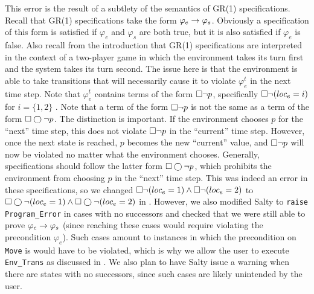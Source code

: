 \documentclass[runningheads]{llncs}
\begin{document}
This error is the result of a subtlety of the semantics of GR(1) specifications. 
Recall that GR(1) specifications take the form $\varphi_e \rightarrow \varphi_s$. 
Obviously a specification of this form is satisfied if $\varphi_e$ and $\varphi_s$ are both true, 
but it is also satisfied if $\varphi_e$ is false. 
Also recall from the introduction that GR(1) specifications are interpreted in the context of a two-player game 
in which the environment takes its turn first and the system takes its turn second. 
The issue here is that the environment is able to take transitions that will necessarily cause it to violate $\varphi_e^t$ in the next time step. 
Note that $\varphi_e^t$ contains terms of the form $\square \lnot p$, specifically $\square \lnot (loc_e = i)$ for $i = \{1, 2\}$  . 
Note that a term of the form $\square \lnot p$ is not the same as a term of the form $\square \varbigcirc \lnot p$. 
The distinction is important. 
If the environment chooses $p$ for the ``next'' time step, this does not violate $\square \lnot p$ in the ``current'' time step. %
However, once the next state is reached, $p$ becomes the new ``current'' value, and $\square \lnot p$ 
will now be violated no matter what the environment chooses.
Generally, specifications should follow the latter form $\square \varbigcirc \lnot p$, 
which prohibits the environment from choosing $p$ in the ``next'' time step. 
This was indeed an error in these specifications, so we changed $\square \lnot (loc_e = 1) \land \square \lnot (loc_e = 2)$
 to $\square \varbigcirc \lnot (loc_e = 1) \land \square \varbigcirc \lnot (loc_e = 2)$ in .
However, we also modified Salty to \lstinline{raise Program_Error} in cases with no successors 
and checked that we were still able to prove $\varphi_e \rightarrow \varphi_s$ 
(since reaching these cases would require violating the precondition $\varphi_e$). 
Such cases amount to instances in which the precondition on \lstinline{Move} is would have to be violated, which is why we allow the user to execute \lstinline{Env_Trans} 
as discussed in . 
We also plan to have Salty issue a warning when there are states with no successors, 
since such cases are likely unintended by the user.


\end{document}
